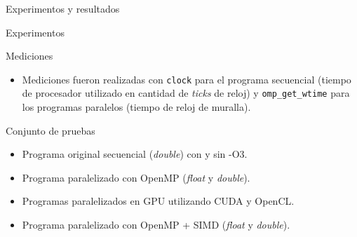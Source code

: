 \begin{frame}
\vfill
\begin{center}
\begin{block}{\begin{center}\begin{Huge}Experimentos y resultados\end{Huge}\end{center}}
\end{block}
\end{center}
\end{frame}


\begin{frame}{Experimentos}

\begin{block}{Mediciones}
\begin{itemize}
  \item Mediciones fueron realizadas con \texttt{clock} para el programa secuencial (tiempo de procesador utilizado en cantidad de \textit{ticks} de reloj) y \texttt{omp\_get\_wtime} para los programas paralelos (tiempo de reloj de muralla).
\end{itemize}
\end{block}

\begin{block}{Conjunto de pruebas}
\begin{itemize}
  \item Programa original secuencial (\textit{double}) con y sin -O3.
  \item Programa paralelizado con OpenMP (\textit{float} y \textit{double}).
  \item Programas paralelizados en GPU utilizando CUDA y OpenCL.
  \item Programa paralelizado con OpenMP + SIMD (\textit{float} y \textit{double}).
\end{itemize}
\end{block}

\end{frame}


